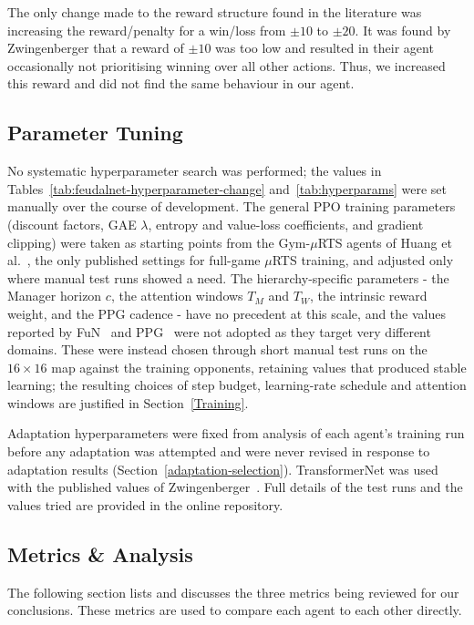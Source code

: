 \documentclass[sigconf,review=false]{acmart}
\begin{document}
The only change made to the reward structure found in the literature was increasing the reward/penalty for a win/loss from $\pm10$ to $\pm20$.
It was found by Zwingenberger \cite{transformernet} that a reward of $\pm10$ was too low and resulted in their agent occasionally not prioritising winning over all other actions.
Thus, we increased this reward and did not find the same behaviour in our agent.

\subsection{Parameter Tuning}
\label{param-tuning}
No systematic hyperparameter search was performed; the values in Tables~\ref{tab:feudalnet-hyperparameter-change} and~\ref{tab:hyperparams} were set manually over the course of development.
The general PPO training parameters (discount factors, GAE $\lambda$, entropy and value-loss coefficients, and gradient clipping) were taken as starting points from the Gym-$\mu$RTS agents of Huang et al.~\cite{micrortsgridnet}, the only published settings for full-game $\mu$RTS training, and adjusted only where manual test runs showed a need.
The hierarchy-specific parameters - the Manager horizon $c$, the attention windows $T_M$ and $T_W$, the intrinsic reward weight, and the PPG cadence - have no precedent at this scale, and the values reported by FuN~\cite{FuN} and PPG~\cite{PPG} were not adopted as they target very different domains.
These were instead chosen through short manual test runs on the $16\times16$ map against the training opponents, retaining values that produced stable learning; the resulting choices of step budget, learning-rate schedule and attention windows are justified in Section~\ref{Training}.

Adaptation hyperparameters were fixed from analysis of each agent's training run before any adaptation was attempted and were never revised in response to adaptation results (Section~\ref{adaptation-selection}).
TransformerNet was used with the published values of Zwingenberger~\cite{transformernet}.
Full details of the test runs and the values tried are provided in the online repository.

\subsection{Metrics \& Analysis}

The following section lists and discusses the three metrics being reviewed for our conclusions.
These metrics are used to compare each agent to each other directly.
\end{document}

